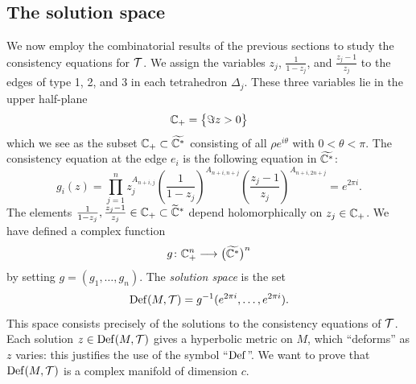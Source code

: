 \subsection{The solution space} \label{solution:space:subsection}
We now employ the combinatorial results of the previous sections to study the consistency equations for $\mathcal{T}$. 
We assign the variables $z_j$, $\frac 1{1-z_j}$, and $\frac{z_j-1}{z_j}$ to the edges of type 1, 2, and 3 in each tetrahedron $\Delta_j$. These three variables lie in the upper half-plane 
$$\mathbb{C}_+ = \big\{\Im z > 0\big\}$$
which we see as the subset $\mathbb{C}_+ \subset \widetilde{\mathbb{C}^*}$ consisting of all $\rho e^{i\theta}$ with $0<\theta < \pi$.
The consistency equation at the edge $e_i$ is the following equation in $\widetilde{\mathbb{C}^*}$:
\begin{equation} \label{gi:eqn}
g_i(z) = \prod_{j=1}^n z_j^{A_{n+i,j}} \left(\frac 1{1-z_j}\right)^{A_{n+i,n+j}} 
\left(\frac{z_j-1}{z_j}\right)^{A_{n+i,2n+j}} = e^{2\pi i}.
\end{equation}
The elements $\frac{1}{1-z_j}, \frac{z_j-1}{z_j}\in\mathbb{C}_{+}\subset \widetilde {\mathbb{C}}^*$ depend holomorphically on $z_j\in\mathbb{C}_{+}$.
We have defined a complex function
$$g \colon \mathbb{C}_{+}^n \longrightarrow \big(\widetilde{\mathbb{C}^*}\big)^n$$
by setting $g=(g_1,\ldots, g_n)$. The \emph{solution space} is the set
$${\rm Def}(M,\mathcal{T}) = g^{-1}(e^{2\pi i},\ldots, e^{2\pi i}).$$
This space consists precisely of the solutions to the consistency equations of $\mathcal{T}$. 
Each solution $z\in {\rm Def}(M,\mathcal{T})$ gives a hyperbolic metric on $M$, which ``deforms'' as $z$ varies: this justifies the use of the symbol ``${\rm Def}$''. We want to prove that ${\rm Def}(M,\mathcal{T})$ is a complex manifold of dimension $c$. 


